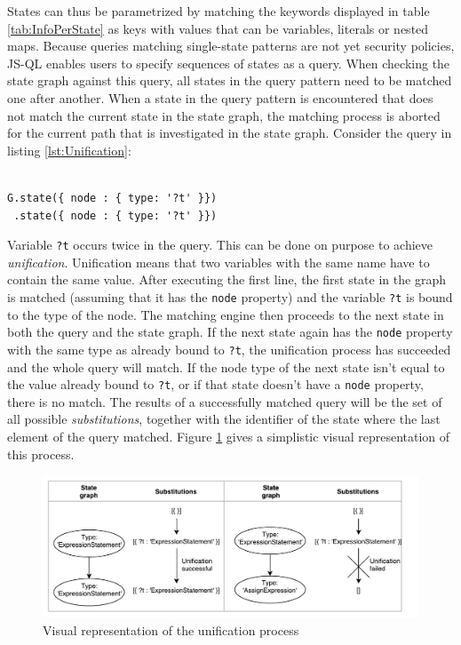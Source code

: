 \noindent States can thus be parametrized by matching the keywords displayed in table \ref{tab:InfoPerState} as keys with values that can be variables, literals or nested maps. Because queries matching single-state patterns are not yet security policies, JS-QL enables users to specify sequences of states as a query. When checking the state graph against this query, all states in the query pattern need to be matched one after another. When a state in the query pattern is encountered that does not match the current state in the state graph, the matching process is aborted for the current path that is investigated in the state graph. Consider the query in listing \ref{lst:Unification}:

\begin{lstlisting}[label={lst:Unification},language=JSQL,caption=Unification in JS-QL,mathescape=true]  % float=t?

G.state({ node : { type: '?t' }})
 .state({ node : { type: '?t' }})
\end{lstlisting}

\noindent Variable \texttt{?t} occurs twice in the query. This can be done on purpose to achieve \textit{unification}. Unification means that two variables with the same name have to contain the same value. After executing the first line, the first state in the graph is matched (assuming that it has the \texttt{node} property) and the variable \texttt{?t} is bound to the type of the node. The matching engine then proceeds to the next state in both the query and the state graph. If the next state again has the \texttt{node} property with the same type as already bound to \texttt{?t}, the unification process has succeeded and the whole query will match. If the node type of the next state isn't equal to the value already bound to \texttt{?t}, or if that state doesn't have a \texttt{node} property, there is no match. The results of a successfully matched query will be the set of all possible \textit{substitutions}, together with the identifier of the state where the last element of the query matched. Figure \ref{fig:Unification} gives a simplistic visual representation of this process.

\begin{figure}[!h]
    \centering
      \includegraphics[width=1\textwidth]{images/Unification} 
      \caption{Visual representation of the unification process}
    \label{fig:Unification}
\end{figure}

